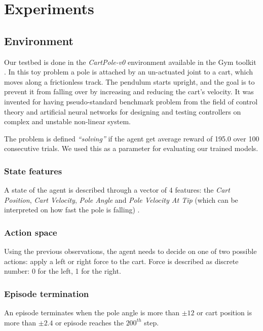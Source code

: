 \section{Experiments}

\subsection{Environment}
Our testbed is done in the \textit{CartPole-v0} environment available in the Gym toolkit \cite{Gym}.
In this toy problem a pole is attached by an un-actuated joint to a cart, which moves along a frictionless track. The pendulum starts upright, and the goal is to prevent it from falling over by increasing and reducing the cart's velocity. It was invented for having pseudo-standard benchmark problem from the field of control theory and artificial neural networks for designing and testing controllers on complex and unstable non-linear system.

The problem is defined \textit{``solving''} if the agent get average reward of 195.0 over 100 consecutive trials. We used this as a parameter for evaluating our trained models.
 
\subsubsection{State features}
A state of the agent is described through a vector of 4 features: the  \textit{Cart Position}, \textit{Cart Velocity}, \textit{Pole Angle} and \textit{Pole Velocity At Tip} (which can be interpreted on how fast the pole is falling) .

\subsubsection{Action space}
Using the previous observations, the agent needs to decide on one of two possible actions: apply a left or right force to the cart. Force is described as discrete number: 0 for the left, 1 for the right.




\subsubsection{Episode termination}
An episode terminates when the pole angle is more than $\pm12$ or cart position is more than $\pm2.4$ or episode reaches the $200^{th}$ step.

